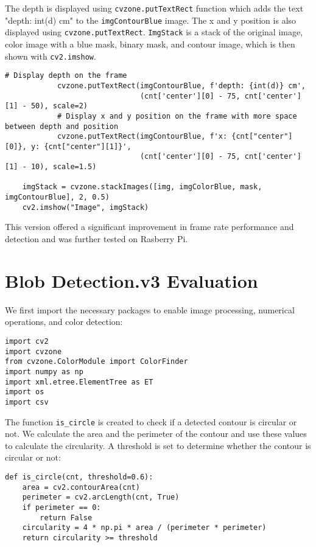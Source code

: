 The depth is displayed using \verb|cvzone.putTextRect| function\cite{CVzoneDoc} which adds the text "depth: {int(d)} cm" to the \verb|imgContourBlue| image. The x and y position is also displayed using \verb|cvzone.putTextRect|. \verb|ImgStack| is a stack of the original image, color image with a blue mask, binary mask, and contour image, which is then shown with \verb|cv2.imshow|\cite{CVzoneDoc}.
\begin{lstlisting}[language=PythonPlus]
            # Display depth on the frame
            cvzone.putTextRect(imgContourBlue, f'depth: {int(d)} cm',
                               (cnt['center'][0] - 75, cnt['center'][1] - 50), scale=2)
            # Display x and y position on the frame with more space between depth and position
            cvzone.putTextRect(imgContourBlue, f'x: {cnt["center"][0]}, y: {cnt["center"][1]}',
                               (cnt['center'][0] - 75, cnt['center'][1] - 10), scale=1.5)

    imgStack = cvzone.stackImages([img, imgColorBlue, mask, imgContourBlue], 2, 0.5)
    cv2.imshow("Image", imgStack)
\end{lstlisting}
This version offered a significant improvement in frame rate performance and detection and was further tested on Rasberry Pi. 

\newpage


\newpage
\section{Blob Detection.v3 Evaluation} \label{C4evaluation}

We first import the necessary packages to enable image processing, numerical operations, and color detection:

\begin{lstlisting}[language=PythonPlus]
import cv2
import cvzone
from cvzone.ColorModule import ColorFinder
import numpy as np
import xml.etree.ElementTree as ET
import os
import csv
\end{lstlisting}

The function \verb|is_circle| is created to check if a detected contour is circular or not. We calculate the area and the perimeter of the contour and use these values to calculate the circularity. A threshold is set to determine whether the contour is circular or not:

\begin{lstlisting}[language=PythonPlus]
def is_circle(cnt, threshold=0.6):
    area = cv2.contourArea(cnt)
    perimeter = cv2.arcLength(cnt, True)
    if perimeter == 0:
        return False
    circularity = 4 * np.pi * area / (perimeter * perimeter)
    return circularity >= threshold
\end{lstlisting}


